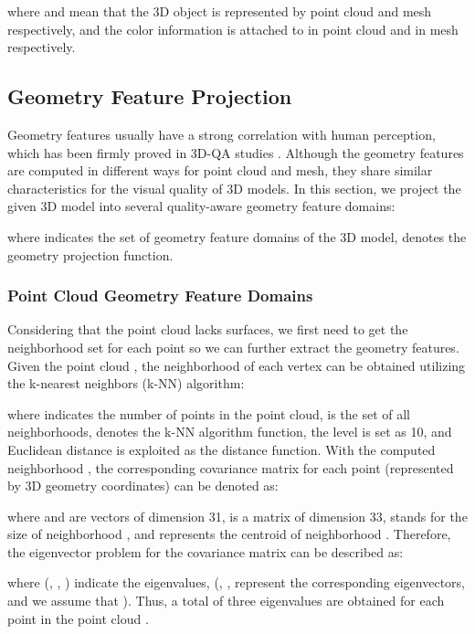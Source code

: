 \documentclass[lettersize,journal]{IEEEtran}
\begin{document}
where  and  mean that the 3D object is represented by point cloud and mesh respectively, and the color information is attached to  in point cloud and  in mesh respectively.


\subsection{Geometry Feature Projection}
Geometry features usually have a strong correlation with human perception, which has been firmly proved in 3D-QA studies \cite{p2point, p2plane, m1,ff2_roughness, p2mesh,angular,pcqa2,dame}. Although the geometry features are computed in different ways for point cloud and mesh, they share similar characteristics for the visual quality of 3D models. In this section, we project the given 3D model into several quality-aware geometry feature domains:

where  indicates the set of geometry feature domains of the 3D model,  denotes the geometry projection function.




\subsubsection{  Point Cloud Geometry Feature Domains}
Considering that the point cloud lacks surfaces, we first need to get the neighborhood set for each point so we can further extract the geometry features. Given the point cloud  , the neighborhood  of each vertex  can be obtained utilizing the k-nearest neighbors (k-NN) algorithm:
  
where  indicates the number of points in the point cloud,  is the set of all neighborhoods,  denotes the k-NN algorithm function, the  level is set as 10, and Euclidean distance  is exploited as the distance function. With the computed neighborhood , the corresponding covariance matrix  for each point  (represented by 3D geometry coordinates) can be denoted as:

{where  and  are vectors of dimension 31,  is a matrix of dimension 33,  stands for the size of neighborhood , and  represents the centroid of neighborhood .} Therefore, the eigenvector problem for the covariance matrix  can be described as:

where (, , ) indicate the eigenvalues, (, ,   represent the corresponding eigenvectors, and we assume that ). Thus, a total of three eigenvalues are obtained for each point  in the point cloud .
\end{document}
